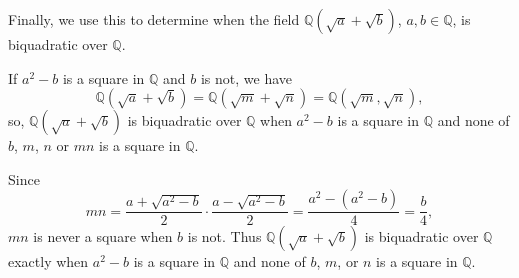 \documentclass[12pt]{article}
\begin{document}
\begin{enumerate}
Finally, we use this to determine when the field $\mathbb{Q}(\sqrt{a}+\sqrt{b})$,  
$a,b\in\mathbb{Q}$, is biquadratic over $\mathbb{Q}$.

If $a^2-b$ is a square in $\mathbb{Q}$ and $b$ is not, we have
\[
\mathbb{Q}(\sqrt{a}+\sqrt{b}) = \mathbb{Q}(\sqrt{m}+\sqrt{n})
= \mathbb{Q}(\sqrt{m},\sqrt{n}),
\]
so, $\mathbb{Q}(\sqrt{a}+\sqrt{b})$ is biquadratic over $\mathbb{Q}$
when $a^{2}-b$ is a square in $\mathbb{Q}$ and none of $b$, $m$, $n$ or $mn$
is a square in $\mathbb{Q}$.

Since
\[
mn = \frac{a+\sqrt{a^{2}-b}}{2}\cdot \frac{a-\sqrt{a^{2}-b}}{2}
= \frac{a^{2}-(a^{2}-b)}{4}
= \frac{b}{4},
\]
$mn$ is never a square when $b$ is not. Thus $\mathbb{Q}(\sqrt{a}+\sqrt{b})$
is biquadratic over $\mathbb{Q}$ exactly when $a^{2}-b$ is a square in $\mathbb{Q}$
and none of $b$, $m$, or $n$ is a square in $\mathbb{Q}$.


    \end{enumerate}
\end{document}
